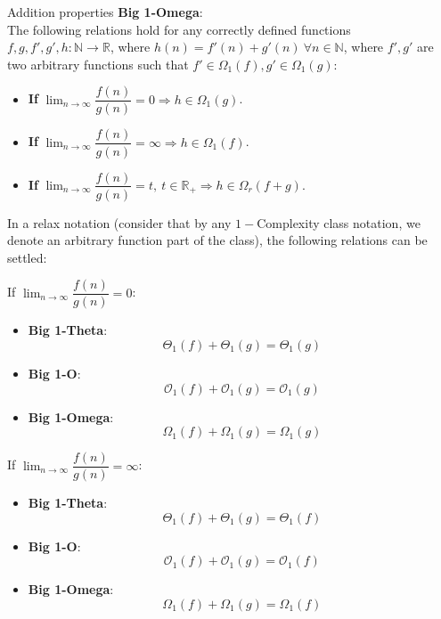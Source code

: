\begin{theorem} 
Addition properties \textbf{Big 1-Omega}: \\
  The following relations hold for any correctly defined functions $f, g, f', g', h:\mathbb{N}\longrightarrow\mathbb{R}$, where $ h(n) = f'(n) + g'(n)\  \forall n \in \mathbb{N} $, where $f',g'$ are two arbitrary functions such that $ f' \in \Omega_{1}(f),  g' \in \Omega_{1}(g) $:  
  \begin{itemize}
  \item \textbf{If} $ \lim_{n\to\infty} \dfrac{f(n)}{g(n)} = 0 \Rightarrow  h \in \Omega_{1}(g) $.
  \item \textbf{If} $ \lim_{n\to\infty} \dfrac{f(n)}{g(n)} = \infty \Rightarrow  h \in \Omega_{1}(f) $. 
  \item \textbf{If} $ \lim_{n\to\infty} \dfrac{f(n)}{g(n)} = t, \ t \in \mathbb{R}_{+} \Rightarrow  h \in \Omega_{r} \left( f + g \right) $.
  \end{itemize}

\end{theorem} 


In a relax notation (consider that by any  $1-$Complexity class notation, we denote an arbitrary function part of the class), the following relations can be settled:

\begin{lemma}
If $\lim_{n\to\infty} \dfrac{f(n)}{g(n)} = 0$:
\begin{itemize}
  \item \textbf{Big 1-Theta}: 
  \[  \Theta_{1}(f) + \Theta_{1}(g) = \Theta_{1}(g)\]
  \item \textbf{Big 1-O}: 
  \[  \mathcal{O}_{1}(f) + \mathcal{O}_{1}(g) = \mathcal{O}_{1}(g)\]
  \item \textbf{Big 1-Omega}: 
  \[  \Omega_{1}(f) + \Omega_{1}(g) = \Omega_{1}(g)\]
\end{itemize}
\end{lemma}

\begin{lemma}
If $\lim_{n\to\infty} \dfrac{f(n)}{g(n)} = \infty$:
\begin{itemize}
  \item \textbf{Big 1-Theta}: 
  \[  \Theta_{1}(f) + \Theta_{1}(g) = \Theta_{1}(f)\]
  \item \textbf{Big 1-O}: 
  \[  \mathcal{O}_{1}(f) + \mathcal{O}_{1}(g) = \mathcal{O}_{1}(f)\]
  \item \textbf{Big 1-Omega}: 
  \[  \Omega_{1}(f) + \Omega_{1}(g) = \Omega_{1}(f)\]
\end{itemize}
\end{lemma}

